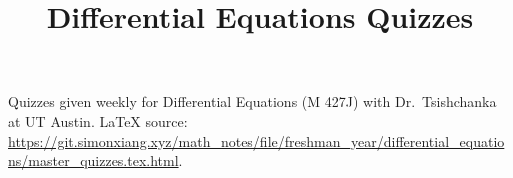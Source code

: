 \documentclass{article}
\title{Differential Equations Quizzes}
\date{}
\begin{document}
\maketitle
Quizzes given weekly for Differential Equations (M 427J) with Dr.\ Tsishchanka at UT Austin. \LaTeX{} source: \url{https://git.simonxiang.xyz/math_notes/file/freshman_year/differential_equations/master_quizzes.tex.html}.
\tableofcontents
    
\end{document}
